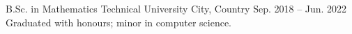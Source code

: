\cventry
  {B.Sc. in Mathematics}                      %
  {Technical University}                      %
  {City, Country}                             %
  {Sep. 2018 -- Jun. 2022}                    %
  {Graduated with honours; minor in computer science.}
